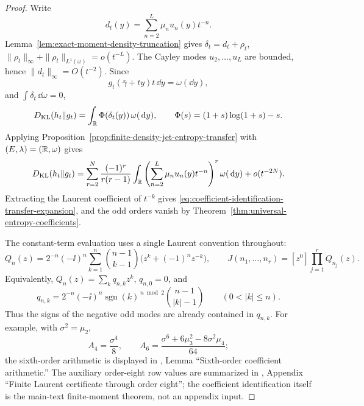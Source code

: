 \begin{proof}
Write
\[
d_t(y)=\sum_{n=2}^{L}\mu_nu_n(y)t^{-n}.
\]
Lemma~\ref{lem:exact-moment-density-truncation} gives
\(\delta_t=d_t+\rho_t\),
\(\|\rho_t\|_\infty+\|\rho_t\|_{L^1(\omega)}=o(t^{-L})\).  The Cayley modes
\(u_2,\ldots,u_L\) are bounded, hence \(\|d_t\|_\infty=O(t^{-2})\).  Since
\[
g_t(\bar{\gamma}+ty)t\,\dd y=\omega(\dd y),
\]
and \(\int\delta_t\,\dd\omega=0\),
\[
D_{\mathrm{KL}}(h_t\|g_t)
=\int_{\mathbb{R}}\Phi(\delta_t(y))\,\omega(\,\mathrm{d} y),
\qquad
\Phi(s)=(1+s)\log(1+s)-s .
\]
Applying
Proposition~\ref{prop:finite-density-jet-entropy-transfer} with
\((E,\lambda)=(\mathbb{R},\omega)\) gives
\[
D_{\mathrm{KL}}(h_t\|g_t)
=
\sum_{r=2}^{N}\frac{(-1)^r}{r(r-1)}
\int_{\mathbb{R}}\left(\sum_{n=2}^{L}\mu_nu_n(y)t^{-n}\right)^r\omega(\,\mathrm{d} y)
+o(t^{-2N}).
\]
Extracting the Laurent coefficient of \(t^{-k}\) gives
\eqref{eq:coefficient-identification-transfer-expansion}, and the odd
orders vanish by Theorem~\ref{thm:universal-entropy-coefficients}.

The constant-term evaluation uses a single Laurent convention throughout:
\[
Q_n(z)=2^{-n}(-\ii)^n
\sum_{k=1}^{n}\binom{n-1}{k-1}
\bigl(z^k+(-1)^nz^{-k}\bigr),
\qquad
J(n_1,\ldots,n_r)=[z^0]\prod_{j=1}^r Q_{n_j}(z).
\]
Equivalently, \(Q_n(z)=\sum_kq_{n,k}z^k\), \(q_{n,0}=0\), and
\[
q_{n,k}=2^{-n}(-\ii)^n
\operatorname{sgn}(k)^{\,n\bmod2}
\binom{n-1}{|k|-1}\qquad(0<|k|\le n).
\]
Thus the signs of the negative odd modes are already contained in
\(q_{n,k}\).  For example, with \(\sigma^2=\mu_2\),
\[
A_4=\frac{\sigma^4}{8},\qquad
A_6=\frac{\sigma^6+6\mu_3^2-8\sigma^2\mu_4}{64};
\]
  the sixth-order arithmetic is displayed in
  , Lemma ``Sixth-order coefficient
  arithmetic.''  The auxiliary order-eight row values are summarized in
  , Appendix ``Finite Laurent certificate through order
  eight''; the coefficient
identification itself is the main-text finite-moment theorem, not an appendix
input.
\end{proof}

